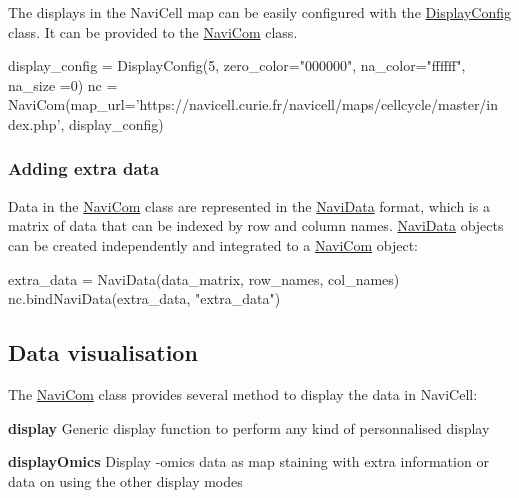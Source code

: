The displays in the NaviCell map can be easily configured with the \hyperlink{classnavicom_1_1displayConfig_1_1DisplayConfig}{DisplayConfig} class. It can be provided to the \hyperlink{classnavicom_1_1navicom_1_1NaviCom}{NaviCom} class. 
\begin{DoxyCode}
display\_config = DisplayConfig(5, zero\_color=\textcolor{stringliteral}{"000000"}, na\_color=\textcolor{stringliteral}{"ffffff"}, na\_size
      =0)
nc = NaviCom(map\_url=\textcolor{stringliteral}{'https://navicell.curie.fr/navicell/maps/cellcycle/master/in
      dex.php'}, display\_config)
\end{DoxyCode}
\hypertarget{main_extra_data}{}\subsubsection{Adding extra data}\label{main_extra_data}
Data in the \hyperlink{classnavicom_1_1navicom_1_1NaviCom}{NaviCom} class are represented in the \hyperlink{classnavicom_1_1navidata_1_1NaviData}{NaviData} format, which is a matrix of data that can be indexed by row and column names. \hyperlink{classnavicom_1_1navidata_1_1NaviData}{NaviData} objects can be created independently and integrated to a \hyperlink{classnavicom_1_1navicom_1_1NaviCom}{NaviCom} object: 
\begin{DoxyCode}
extra\_data = NaviData(data\_matrix, row\_names, col\_names)
nc.bindNaviData(extra\_data, \textcolor{stringliteral}{"extra\_data"})
\end{DoxyCode}
\hypertarget{main_visualisation}{}\subsection{Data visualisation}\label{main_visualisation}
The \hyperlink{classnavicom_1_1navicom_1_1NaviCom}{NaviCom} class provides several method to display the data in NaviCell: \begin{DoxyItemize}
\item {\bfseries display} Generic display function to perform any kind of personnalised display \item {\bfseries displayOmics} Display -\/omics data as map staining with extra information or data on using the other display modes \end{DoxyItemize}
